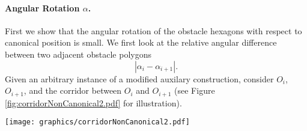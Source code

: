 \paragraph{Angular Rotation $\alpha$.}
First we show that the angular rotation of the obstacle hexagons with respect to canonical position is small.  
We first look at the relative angular difference between two adjacent obstacle polygons
$$\left\vert \alpha_i - \alpha_{i+1} \right\vert.$$
Given an arbitrary instance of a modified auxilary construction, consider $O_i$, $O_{i+1}$, and the corridor between $O_i$ and $O_{i+1}$ (see Figure \ref{fig:corridorNonCanonical2.pdf} for illustration).

\begin{minipage}{\linewidth}
\begin{center}
\texttt{[image: graphics/corridorNonCanonical2.pdf]}
\label{fig:corridorNonCanonical2.pdf}
\end{center}
\end{minipage}

